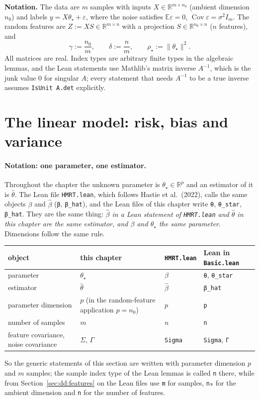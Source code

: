 \medskip\noindent\textbf{Notation.}
The data are $m$ samples with inputs $X\in\mathbb R^{m\times n_0}$ (ambient dimension $n_0$) and labels
$y=X\theta_\star+\varepsilon$, where the noise satisfies $\mathbb E\varepsilon=0$, $\operatorname{Cov}\varepsilon=\sigma^2I_m$.
The random features are $Z:=XS\in\mathbb R^{m\times n}$ with a projection $S\in\mathbb R^{n_0\times n}$ ($n$ features), and
\[
  \gamma:=\frac{n_0}{m},\qquad \delta:=\frac nm,\qquad \rho_\star:=\|\theta_\star\|^2 .
\]
All matrices are real. Index types are arbitrary finite types in the algebraic lemmas, and the Lean statements use
Mathlib's matrix inverse $A^{-1}$, which is the junk value $0$ for singular $A$; every statement that needs $A^{-1}$ to
be a true inverse assumes \texttt{IsUnit A.det} explicitly.


\section{The linear model: risk, bias and variance}\label{sec:dd:risk}

\paragraph{Notation: one parameter, one estimator.}
Throughout the chapter the unknown parameter is $\theta_\star\in\mathbb R^p$ and an estimator of it is $\hat\theta$. The Lean file \texttt{HMRT.lean}, which follows Hastie et al.\ (2022), calls the same objects
$\beta$ and $\hat\beta$ (\texttt{β}, \texttt{β\_hat}), and the Lean files of this chapter write \texttt{θ}, \texttt{θ\_star}, \texttt{β\_hat}. They are the same thing: \emph{$\hat\beta$ in a Lean statement of \texttt{HMRT.lean} and $\hat\theta$ in this chapter are the
same estimator, and $\beta$ and $\theta_\star$ the same parameter}. Dimensions follow the same rule.
\begin{center}
\small
\begin{tabular}{p{}p{}p{}p{}}
object & this chapter & \texttt{HMRT.lean} & Lean in \texttt{Basic.lean}\\ \hline
parameter & $\theta_\star$ & $\beta$ & \texttt{θ}, \texttt{θ\_star}\\
estimator & $\hat\theta$ & $\hat\beta$ & \texttt{β\_hat}\\
parameter dimension & $p$ (in the random-feature application $p=n_0$) & $p$ & \texttt{p}\\
number of samples & $m$ & $n$ & \texttt{n}\\
feature covariance, noise covariance & $\Sigma$, $\Gamma$ & \texttt{Sigma} & \texttt{Sigma}, \texttt{Γ}
\end{tabular}
\end{center}
So the generic statements of this section are written with parameter dimension $p$ and $m$ samples; the sample index type of the Lean lemmas is called \texttt{n} there, while from Section~\ref{sec:dd:features} on the Lean files use \texttt{m} for samples, \texttt{n₀} for the ambient dimension and \texttt{n} for the number of features.

